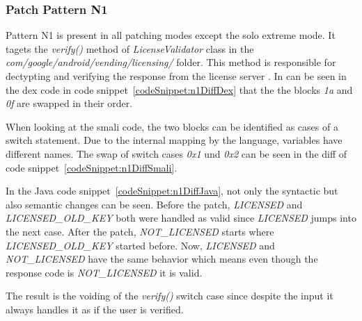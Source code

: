 \subsubsection{Patch Pattern N1}
Pattern N1 is present in all patching modes except the solo extreme mode.
It tagets the \textit{verify()} method of \textit{LicenseValidator} class in the \textit{com/google/android/vending/licensing/} folder.
This method is responsible for dectypting and verifying the response from the license server \cite{developersLicensingReference}.
\newline
In can be seen in the dex code in code snippet~\ref{codeSnippet:n1DiffDex} that the the blocks \textit{1a} and \textit{0f} are swapped in their order.
\newline

When looking at the smali code, the two blocks can be identified as cases of a switch statement.
Due to the internal mapping by the language, variables have different names.
The swap of switch cases \textit{0x1} und \textit{0x2} can be seen in the diff of code snippet~\ref{codeSnippet:n1DiffSmali}.
\newline

In the Java code snippet~\ref{codeSnippet:n1DiffJava}, not only the syntactic but also semantic changes can be seen.
Before the patch, \textit{LICENSED} and \textit{LICENSED\_OLD\_KEY} both were handled as valid since \textit{LICENSED} jumps into the next case.
After the patch, \textit{NOT\_LICENSED} starts where \textit{LICENSED\_OLD\_KEY} started before.
Now, \textit{LICENSED} and \textit{NOT\_LICENSED} have the same behavior which means even though the response code is \textit{NOT\_LICENSED} it is valid.
\newline

The result is the voiding of the \textit{verify()} switch case since despite the input it always handles it as if the user is verified.
